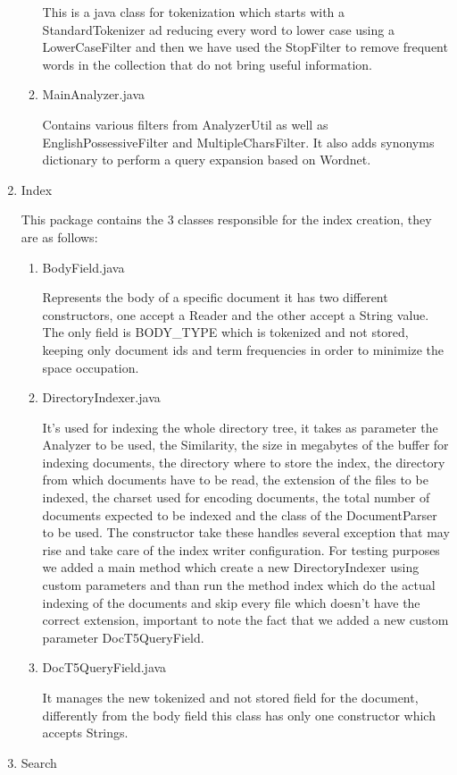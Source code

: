 \begin{enumerate}
\begin{enumerate}
            This is a java class for tokenization which starts with a StandardTokenizer ad reducing every word to lower case using a LowerCaseFilter and then we have used the StopFilter to remove frequent words in the collection that do not bring useful information. 
            \item MainAnalyzer.java
            
            Contains various filters from AnalyzerUtil as well as EnglishPossessiveFilter and MultipleCharsFilter. It also adds synonyms dictionary to perform a query expansion based on Wordnet.
        \end{enumerate}
  \item Index
  
     This package contains the 3 classes responsible for the index creation, they are as follows: 
    \begin{enumerate}
    \item  BodyField.java
    
        Represents the body of a specific document it has two different constructors, one accept a Reader and the other accept a String value. The only field is BODY\_TYPE  which is tokenized and not stored, keeping only document ids and term frequencies in order to minimize the space occupation. 
    \item DirectoryIndexer.java 
    
        It's used for indexing the whole directory tree, it takes as parameter the Analyzer to be used, the Similarity, the size in megabytes of the buffer for indexing documents, the directory where to store the index, the directory from which documents have to be read, the extension of the files to be indexed, the charset used for encoding documents, the total number of documents expected to be indexed and the class of the DocumentParser to be used. The constructor take these handles several exception that may rise and take care of the index writer configuration. For testing purposes we added a main method which create a new DirectoryIndexer using custom parameters and than run the method index which do the actual indexing of the documents and skip every file which doesn't have the correct extension, important to note the fact that we added a new custom parameter DocT5QueryField. 
    \item DocT5QueryField.java
    
        It manages the new tokenized and not stored field for the document, differently from the body field this class has only one constructor which accepts Strings.
     \end{enumerate}
  \item Search
  

\end{enumerate}
